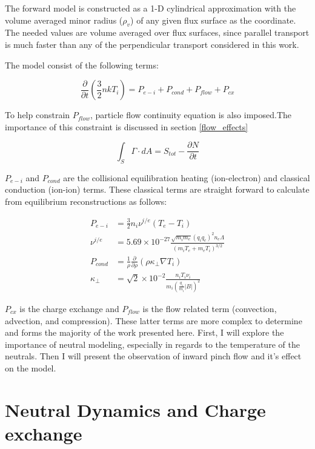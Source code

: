 \documentclass[aip, pop, preprint]{revtex4-1}
\begin{document}
The forward model is constructed as a 1-D cylindrical approximation with the volume averaged minor radius ($ \rho_v $) of any given flux surface as the coordinate. The needed values are volume averaged over flux surfaces, since parallel transport is much faster than any of the perpendicular transport considered in this work.

The model consist of the following terms:

\begin{equation}\label{eqn:balance}
\frac{\partial}{\partial t}\left(\frac{3}{2}nkT_{i}\right) = P_{e-i} + P_{cond} + P_{flow} + P_{cx} %
\end{equation}

To help constrain $P_{flow}$, particle flow continuity equation is also imposed.The importance of this constraint is discussed in section \ref{flow_effects}

\begin{equation}\label{eqn:cont}
\int_{S} \Gamma\cdot dA = S_{tot}-\frac{\partial N}{\partial t}
\end{equation}



$ P_{e-i} $ and $ P_{cond} $ are the collisional equilibration heating (ion-electron) and classical conduction (ion-ion) terms. These classical terms are straight forward to calculate from equilibrium reconstructions as follows:

\begin{align}\label{eqn:p_ei}
    P_{e-i} &= \frac{3}{2}n_i\nu^{i/e}(T_e - T_i)\\
    \nu^{i/e} &= 5.69\times10^{-27} \frac{\sqrt{m_i m_e}(q_i q_e)^2 n_e \Lambda}{(m_i T_e + m_e T_i)^{3/2}}\\
    P_{cond} &= \frac{1}{\rho}\frac{\partial}{\partial\rho}(\rho\kappa_{\perp}\nabla T_{i})\\
    \kappa_{\perp} &= \sqrt{2} \times 10^{-2}\frac{n_i T_i \nu_i}{m_i(\frac{q_i}{m_i} |B|)^2}
\end{align}

$P_{cx}$ is the charge exchange and $P_{flow}$ is the flow related term (convection, advection, and compression). These latter terms are more complex to determine and forms the majority of the work presented here. First, I will explore the importance of neutral modeling, especially in regards to the temperature of the neutrals. Then I will present the observation of inward pinch flow and it's effect on the model.

\section{Neutral Dynamics and Charge exchange}\label{neutral}
\end{document}
